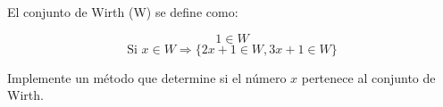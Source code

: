  El conjunto de Wirth (W) se define como:

\[ 1 \in W \]
\[ \text{Si } x \in W \Rightarrow \{ 2x + 1 \in W, 3x + 1 \in W \} \]

Implemente un método que determine si el número \( x \) pertenece al conjunto de Wirth.
